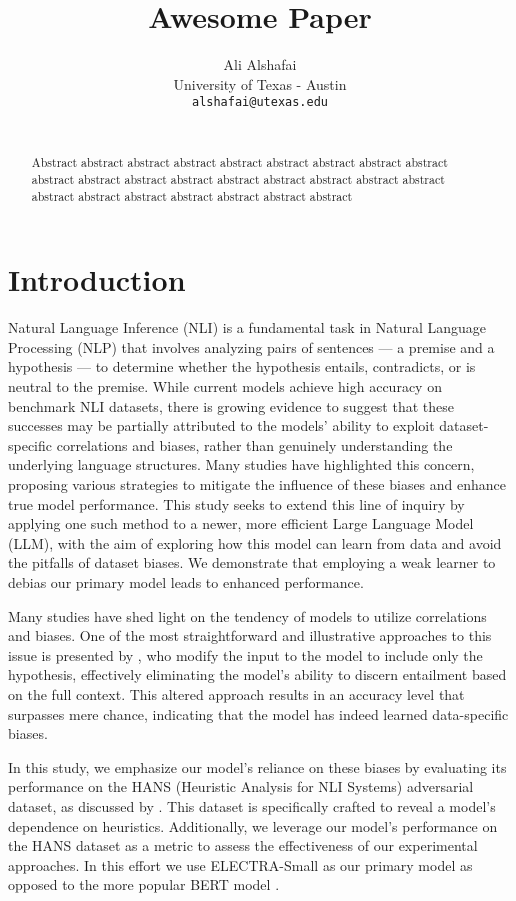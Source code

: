 \documentclass[11pt,a4paper]{article}
\title{Awesome Paper}
\author{Ali Alshafai \\
  University of Texas - Austin \\
  \texttt{alshafai@utexas.edu} \\\\}
\date{}
\begin{document}
\maketitle
\begin{abstract}
  Abstract abstract abstract abstract abstract abstract abstract abstract abstract abstract abstract abstract abstract abstract abstract abstract abstract abstract abstract abstract abstract abstract abstract abstract abstract 
\end{abstract}



\section{Introduction}
Natural Language Inference (NLI) is a fundamental task in Natural Language Processing (NLP) that involves analyzing pairs of sentences — a premise and a hypothesis — to determine whether the hypothesis entails, contradicts, or is neutral to the premise. While current models achieve high accuracy on benchmark NLI datasets, there is growing evidence to suggest that these successes may be partially attributed to the models' ability to exploit dataset-specific correlations and biases, rather than genuinely understanding the underlying language structures. Many studies have highlighted this concern, proposing various strategies to mitigate the influence of these biases and enhance true model performance. This study seeks to extend this line of inquiry by applying one such method to a newer, more efficient Large Language Model (LLM), with the aim of exploring how this model can learn from data and avoid the pitfalls of dataset biases. We demonstrate that employing a weak learner to debias our primary model leads to enhanced performance.

Many studies have shed light on the tendency of models to utilize correlations and biases. One of the most straightforward and illustrative approaches to this issue is presented by \citet{poliak2018hypothesis}, who modify the input to the model to include only the hypothesis, effectively eliminating the model's ability to discern entailment based on the full context. This altered approach results in an accuracy level that surpasses mere chance, indicating that the model has indeed learned data-specific biases.

In this study, we emphasize our model's reliance on these biases by evaluating its performance on the HANS (Heuristic Analysis for NLI Systems) adversarial dataset, as discussed by \citet{mccoy2019right}. This dataset is specifically crafted to reveal a model's dependence on heuristics. Additionally, we leverage our model's performance on the HANS dataset as a metric to assess the effectiveness of our experimental approaches. In this effort we use ELECTRA-Small \cite{clark2020electra} as our primary model as opposed to the more popular BERT model \cite{devlin2019bert}.
\end{document}
